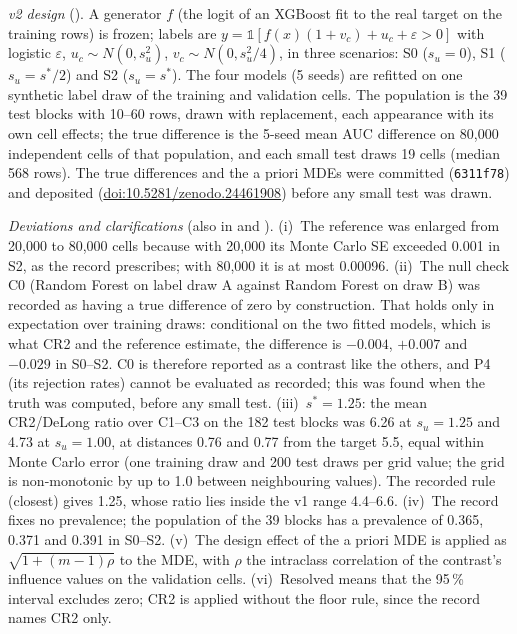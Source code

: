 \documentclass[11pt,a4paper]{article}
\begin{document}
\emph{v2 design} (). A generator $f$ (the logit of an XGBoost fit to the real target on the training rows) is frozen; labels are $y=\mathbb{1}[f(x)(1+v_c)+u_c+\varepsilon>0]$ with logistic $\varepsilon$, $u_c\sim N(0,s_u^2)$, $v_c\sim N(0,s_u^2/4)$, in three scenarios: S0 ($s_u=0$), S1 ($s_u=s^*/2$) and S2 ($s_u=s^*$). The four models (5 seeds) are refitted on one synthetic label draw of the training and validation cells. The population is the 39 test blocks with 10--60 rows, drawn with replacement, each appearance with its own cell effects; the true difference is the 5-seed mean AUC difference on 80{,}000 independent cells of that population, and each small test draws 19 cells (median 568 rows). The true differences and the a priori MDEs were committed (\texttt{6311f78}) and deposited (\href{https://doi.org/10.5281/zenodo.24461908}{doi:10.5281/zenodo.24461908}) before any small test was drawn.

\emph{Deviations and clarifications} (also in  and ). (i)~The reference was enlarged from 20{,}000 to 80{,}000 cells because with 20{,}000 its Monte Carlo SE exceeded 0.001 in S2, as the record prescribes; with 80{,}000 it is at most 0.00096. (ii)~The null check C0 (Random Forest on label draw A against Random Forest on draw B) was recorded as having a true difference of zero by construction. That holds only in expectation over training draws: conditional on the two fitted models, which is what CR2 and the reference estimate, the difference is $-0.004$, $+0.007$ and $-0.029$ in S0--S2. C0 is therefore reported as a contrast like the others, and P4 (its rejection rates) cannot be evaluated as recorded; this was found when the truth was computed, before any small test. (iii)~$s^*=1.25$: the mean CR2/DeLong ratio over C1--C3 on the 182 test blocks was 6.26 at $s_u=1.25$ and 4.73 at $s_u=1.00$, at distances 0.76 and 0.77 from the target 5.5, equal within Monte Carlo error (one training draw and 200 test draws per grid value; the grid is non-monotonic by up to 1.0 between neighbouring values). The recorded rule (closest) gives 1.25, whose ratio lies inside the v1 range 4.4--6.6. (iv)~The record fixes no prevalence; the population of the 39 blocks has a prevalence of 0.365, 0.371 and 0.391 in S0--S2. (v)~The design effect of the a priori MDE is applied as $\sqrt{1+(m-1)\rho}$ to the MDE, with $\rho$ the intraclass correlation of the contrast's influence values on the validation cells. (vi)~Resolved means that the 95\,\% interval excludes zero; CR2 is applied without the floor rule, since the record names CR2 only.
\end{document}
